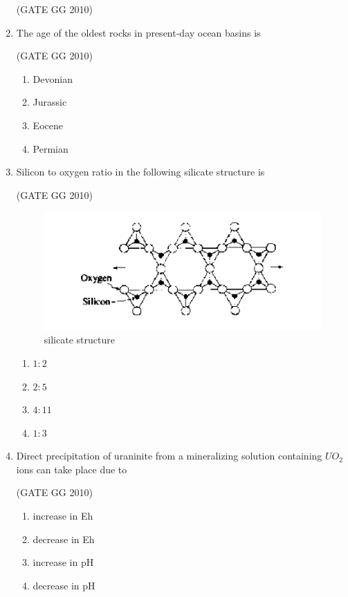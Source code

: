 \documentclass[journal]{IEEEtran}
\begin{document}
\begin{enumerate}[start=1]
\hfill{(GATE GG 2010)}


\begin{enumerate}
\end{enumerate}

\item The age of the oldest rocks in present-day ocean basins is

\hfill{(GATE GG 2010)}

\begin{enumerate}
    \item Devonian
    \item Jurassic
    \item Eocene
    \item Permian
\end{enumerate}
\item Silicon to oxygen ratio in the following silicate structure is

\hfill{(GATE GG 2010)}

\begin{figure}[H]
    \centering
    \includegraphics[width=0.5\linewidth]{figs/Screenshot from 2025-08-05 22-06-18.png}
    \caption{silicate structure}
    \label{fig:silicate}
\end{figure}
\begin{enumerate}
    \item $1:2$
    \item $2:5$
    \item $4:11$
    \item $1:3$
\end{enumerate}

\item Direct precipitation of uraninite from a mineralizing solution containing  $UO_2$ions can take place due to

\hfill{(GATE GG 2010)}

\begin{enumerate}
    \item increase in Eh
    \item decrease in Eh
    \item increase in pH
    \item  decrease in pH
\end{enumerate}


\end{enumerate}
\end{document}
